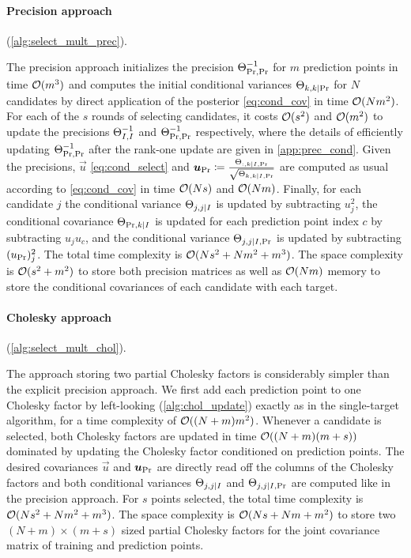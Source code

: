 \documentclass[review,supplement,onefignum,onetabnum]{siamonline220329}
\begin{document}
\paragraph{Precision approach}
(\cref{alg:select_mult_prec}).

The precision approach initializes the precision \( \Theta_{\text{Pr}, \text{Pr}}^{-1} \)
for \( m \) prediction points in time \( \mathcal{O}(m^3) \) and computes the initial
conditional variances \( \Theta_{k, k \mid \text{Pr}} \) for \( N \) candidates by
direct application of the posterior \cref{eq:cond_cov} in time \( \mathcal{O}(N m^2)
\).
For each of the \( s \) rounds of selecting candidates, it costs \(
\mathcal{O}(s^2) \) and \( \mathcal{O}(m^2) \) to update the precisions \( \Theta_{I,
I}^{-1} \) and \( \Theta_{\text{Pr}, \text{Pr}}^{-1} \) respectively, where the details
of efficiently updating \( \Theta_{\text{Pr}, \text{Pr}}^{-1} \) after the rank-one
update are given in \cref{app:prec_cond}.
Given the precisions, \( \vec{u} \) \cref{eq:cond_select} and \( \bm{u}_{\text{Pr}}
\coloneqq \frac{\Theta_{:, k \mid I, \text{Pr}}}{\sqrt{\Theta_{k, k \mid I, \text{Pr}}}} \)
are computed as usual according to \cref{eq:cond_cov} in time \( \mathcal{O}(N s) \)
and \( \mathcal{O}(N m) \).
Finally, for each candidate \( j \) the conditional variance \( \Theta_{j, j \mid
I} \) is updated by subtracting \( u_j^2 \), the conditional covariance \(
\Theta_{\text{Pr}, k \mid I} \) is updated for each prediction point index \( c \)
by subtracting \( u_j u_c \), and the conditional variance \( \Theta_{j, j \mid
I, \text{Pr}} \) is updated by subtracting \( (u_{\text{Pr}})_j^2 \).
The total time complexity is \( \mathcal{O}(N s^2 + N m^2 + m^3) \).
The space complexity is \( \mathcal{O}(s^2 + m^2) \) to store both
precision matrices as well as \( \mathcal{O}(N m) \) memory to store
the conditional covariances of each candidate with each target.

\paragraph{Cholesky approach}
(\cref{alg:select_mult_chol}).

The approach storing two partial Cholesky factors is
considerably simpler than the explicit precision approach.
We first add each prediction point to one Cholesky factor by
left-looking (\cref{alg:chol_update}) exactly as in the single-target
algorithm, for a time complexity of \( \mathcal{O}((N + m) m^2) \).
Whenever a candidate is selected, both Cholesky factors are
updated in time \( \mathcal{O}((N + m)(m + s)) \) dominated by
updating the Cholesky factor conditioned on prediction points.
The desired covariances \( \vec{u} \) and \( \bm{u}_{\text{Pr}} \) are directly
read off the columns of the Cholesky factors and both conditional variances
\( \Theta_{j, j \mid I} \) and \( \Theta_{j, j \mid I, \text{Pr}} \) are computed like
in the precision approach.
For \( s \) points selected, the total time
complexity is \( \mathcal{O}(N s^2 + N m^2 + m^3) \).
The space complexity is \( \mathcal{O}(N s + N m + m^2) \) to store two
\( (N + m) \times (m + s) \) sized partial Cholesky factors for
the joint covariance matrix of training and prediction points.
\end{document}

